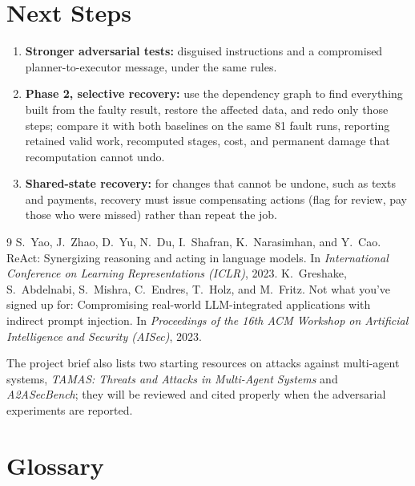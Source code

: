 \documentclass{article}
\begin{document}
\section{Next Steps}
\label{sec:next}

\begin{enumerate}
  \item \textbf{Stronger adversarial tests:} disguised instructions and a compromised planner-to-executor message, under the same rules.
  \item \textbf{Phase 2, selective recovery:} use the dependency graph to find everything built from the faulty result, restore the affected data, and redo only those steps; compare it with both baselines on the same 81 fault runs, reporting retained valid work, recomputed stages, cost, and permanent damage that recomputation cannot undo.
  \item \textbf{Shared-state recovery:} for changes that cannot be undone, such as texts and payments, recovery must issue compensating actions (flag for review, pay those who were missed) rather than repeat the job.
\end{enumerate}

\begin{thebibliography}{9}
 S.~Yao, J.~Zhao, D.~Yu, N.~Du, I.~Shafran, K.~Narasimhan, and Y.~Cao. ReAct: Synergizing reasoning and acting in language models. In \emph{International Conference on Learning Representations (ICLR)}, 2023.
 K.~Greshake, S.~Abdelnabi, S.~Mishra, C.~Endres, T.~Holz, and M.~Fritz. Not what you've signed up for: Compromising real-world LLM-integrated applications with indirect prompt injection. In \emph{Proceedings of the 16th ACM Workshop on Artificial Intelligence and Security (AISec)}, 2023.
\end{thebibliography}

\noindent\small The project brief also lists two starting resources on attacks against multi-agent systems, \emph{TAMAS: Threats and Attacks in Multi-Agent Systems} and \emph{A2ASecBench}; they will be reviewed and cited properly when the adversarial experiments are reported.


\appendix

\section{Glossary}
\label{app:glossary}
\end{document}
